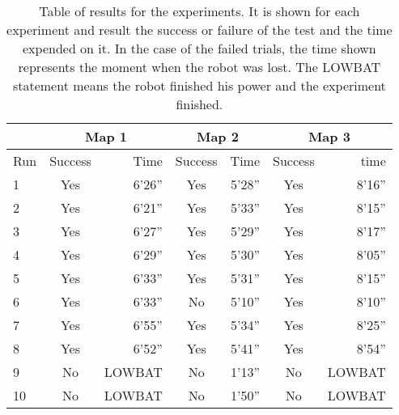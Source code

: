 \begin{table}[H]
	\center
	
	\begin{tabular}{|l|c|r|c|r|c|r|}
	  	\cline{2-7}
	  	\multicolumn{1}{r}{}
 		&  \multicolumn{2}{|c|}{Map 1}
 		& \multicolumn{2}{|c|}{Map 2} 
 		& \multicolumn{2}{|c|}{Map 3}  
		 \\ \cline{2-7}
		\hline
		Run & Success & Time & Success & Time & Success & time \\
		\hline
		1 	& Yes & 6'26'' & Yes & 5'28'' & Yes & 8'16''\\
		2 	& Yes & 6'21'' & Yes & 5'33'' & Yes & 8'15''\\
		3 	& Yes & 6'27'' & Yes & 5'29'' & Yes & 8'17''\\
		4 	& Yes & 6'29'' & Yes & 5'30'' & Yes & 8'05''\\
		5 	& Yes & 6'33'' & Yes & 5'31'' & Yes & 8'15''\\
		6 	& Yes & 6'33'' & No  & 5'10'' & Yes & 8'10''\\
		7 	& Yes & 6'55'' & Yes & 5'34'' & Yes & 8'25''\\
		8 	& Yes & 6'52'' & Yes & 5'41'' & Yes & 8'54''\\
		9 	& No & LOWBAT  & No  & 1'13'' & No 	& LOWBAT\\
		10 	& No & LOWBAT  & No  & 1'50'' & No 	& LOWBAT\\		
		\hline
	\end{tabular}

	\caption{Table of results for the experiments. It is shown for each experiment and result the success or failure of the test and the time expended on it. In the case of the failed trials, the time shown represents the moment when the robot was lost. The LOWBAT statement means the robot finished his power and the experiment finished.}
	\label{tab:Experiment1}
\end{table}